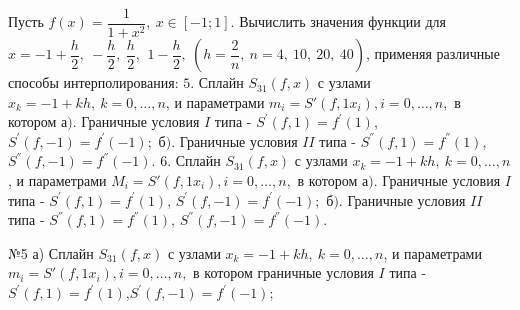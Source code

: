 \documentclass[rus, 12 pt]{article}
\begin{document}
Пусть \(f(x)=\dfrac{1}{1+x^2},\:x\in\left[-1;1\right]\). Вычислить
значения функции для
\(x=-1+\dfrac{h}{2},\:-\dfrac{h}{2},\:\dfrac{h}{2}\),
\(\:1-\dfrac{h}{2},\:\left(h=\dfrac{2}{n},\:n=4,\:10, \:20,\:40\right)\),
применяя различные способы интерполирования: \(5.\) Сплайн
\(S_{31}(f,x)\) с узлами \(x_k=-1+kh,\:k=0,\ldots,n\), и параметрами
\(m_i=S'(f,1x_i),i=0,\ldots,n,\) в котором \(а).\) Граничные условия
\(I\) типа - \(S^{'}(f,1)=f^{'}(1)\), \(S^{'}(f,-1)=f^{'}(-1);\) \(б).\)
Граничные условия \(II\) типа - \(S^{''}(f,1)=f^{''}(1)\),
\(S^{''}(f,-1)=f^{''}(-1).\) \(6.\) Сплайн \(S_{31}(f,x)\) с узлами
\(x_k=-1+kh,\:k=0,\ldots,n\), и параметрами
\(M_i=S'(f,1x_i),i=0,\ldots,n,\) в котором \(а).\) Граничные условия
\(I\) типа - \(S^{'}(f,1)=f^{'}(1)\), \(S^{'}(f,-1)=f^{'}(-1);\) \(б).\)
Граничные условия \(II\) типа - \(S^{''}(f,1)=f^{''}(1)\),
\(S^{''}(f,-1)=f^{''}(-1).\)

№5 а) Сплайн \(S_{31}(f,x)\) с узлами \(x_k=-1+kh,\:k=0,\ldots,n\), и
параметрами \(m_i=S'(f,1x_i),i=0,\ldots,n,\) в котором граничные условия
\(I\) типа - \(S^{'}(f,1)=f^{'}(1)\),\(S^{'}(f,-1)=f^{'}(-1);\)
\end{document}
